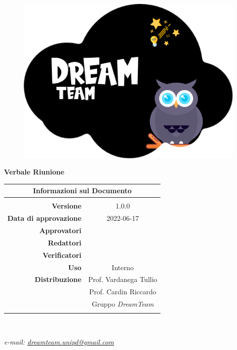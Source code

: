 \begin{center}

	\begin{figure}
		\centering
		\includegraphics[scale=0.05]{Sezioni/images/DreamTeam.png}
	\end{figure}

	{\Huge{\textbf{Verbale Riunione \D}}} \\ [1cm]

	\begin{table}[htbp]
		\centering
		\begin{tabular}{r|c}
			\multicolumn{2}{c}{\textbf{Informazioni sul Documento}}   \\
			\hline                                                    \\
			\textbf{Versione}             & 1.0.0                     \\ \rule{0pt}{3ex}
			\textbf{Data di approvazione} &    2022-06-17       \\ \rule{0pt}{3ex}
			\textbf{Approvatori}          &          \FP              \\ \rule{0pt}{3ex}
			\textbf{Redattori}            & \PV                       \\ \rule{0pt}{3ex}
			\textbf{Verificatori}         &   \GC              \\ \rule{0pt}{3ex}
			\textbf{Uso}                  & Interno                   \\ \rule{0pt}{3ex}
			\textbf{Distribuzione}        & Prof. Vardanega Tullio    \\ \rule{0pt}{2ex}
			                              & Prof. Cardin Riccardo     \\ \rule{0pt}{2ex}
			                              & Gruppo \textit{DreamTeam} \\ \rule{0pt}{0.1cm}
		\end{tabular} \\ [0.5cm]
	\end{table}

	\textsl{ e-mail: \href{mailto:dreamteam.unipd@gmail.com}{dreamteam.unipd@gmail.com} } \\[2cm]
\end{center}
\pagebreak